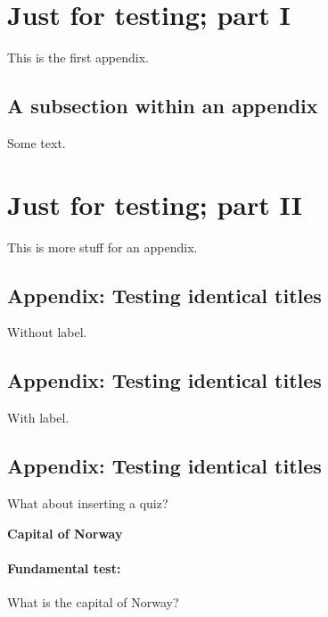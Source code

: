 \documentclass[%
oneside,                 %
final,                   %
10pt]{article}
\newenvironment{doconcequiz}{}{}
\newcounter{doconcequizcounter}
\theoremstyle{definition}
\begin{document}
\begin{enumerate}





\appendix

\section{Just for testing; part I}
\label{app1}

This is the first appendix.

\subsection{A subsection within an appendix}

Some text.

\section{Just for testing; part II}
\label{app2}

This is more stuff for an appendix.

\subsection{Appendix: Testing identical titles}

Without label.

\subsection{Appendix: Testing identical titles}
\label{test:title:id1}

With label.

\subsection{Appendix: Testing identical titles}
\label{test:title:id2}

What about inserting a quiz?


\begin{doconcequiz}
\label{quiz:2}


\noindent\textbf{\large Capital of Norway}
\paragraph{Fundamental test:}
What is the capital of Norway?

\vspace{2mm}


\end{doconcequiz}
\end{enumerate}
\end{document}
